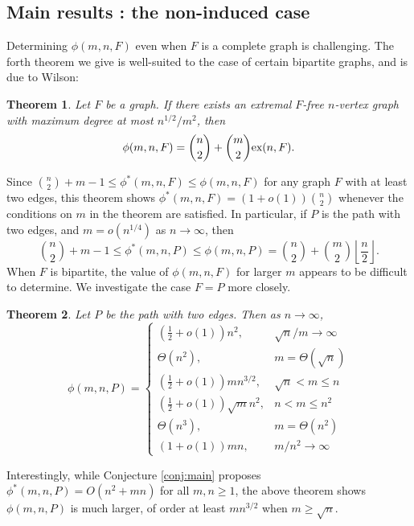 \documentclass[12pt]{article}
\newtheorem{theorem}{Theorem}
\newcommand*{\ex}{\textnormal{ex}}
\begin{document}
\subsection{Main results : the non-induced case}

Determining $\phi(m, n, F)$ even when $F$ is a complete graph is challenging. The forth theorem we give is well-suited to the case of certain bipartite graphs, and is due to Wilson:

\begin{theorem}\label{wilsontheorem}
  Let $F$ be a graph. If there exists an extremal $F$-free $n$-vertex graph with maximum degree at most $n^{1/2}/m^2$, then 
  \[ 
    \phi(m, n, F) = \binom{n}{2} + \binom{m}{2}\ex(n,F).
  \]
\end{theorem}

Since $\binom{n}{2} + m - 1 \leq \phi^*(m, n, F) \leq \phi(m, n, F)$ for any graph $F$ with at least two edges, this theorem shows $\phi^*(m, n, F) = (1 + o(1))\binom{n}{2}$ whenever the conditions on $m$ in the theorem are satisfied. In particular, if $P$ is the path with two edges, and $m = o(n^{1/4})$ as $n \rightarrow \infty$, then 
\[ 
  \binom{n}{2} + m - 1 \leq \phi^*(m, n, P) \leq \phi(m, n, P) = \binom{n}{2} + \binom{m}{2} \left\lfloor \frac{n}{2}\right\rfloor. 
\]
When $F$ is bipartite, the value of $\phi(m, n, F)$ for larger $m$ appears to be difficult to determine. We investigate the case $F = P$ more closely. 

\begin{theorem}\label{thm:pm}
Let $P$ be the path with two edges. Then as $n \rightarrow \infty$,
\[
  \phi(m, n, P) = \begin{cases}
    \left(\frac{1}{2} + o(1)\right)n^2, & \sqrt{n}/m \to \infty \\
    \Theta(n^2), & m = \Theta(\sqrt{n}) \\
    \left(\frac{1}{2} + o(1)\right)mn^{3/2}, & \sqrt{n} < m \leq n \\
    \left(\frac{1}{2} + o(1)\right)\sqrt{m}n^{2}, & n < m \leq n^2 \\
    \Theta(n^3), & m = \Theta(n^2) \\
    \left(1 + o(1)\right)mn, & m/n^2 \to \infty
  \end{cases}
\]
\end{theorem}

Interestingly, while Conjecture \ref{conj:main} proposes $\phi^*(m, n, P) = O(n^2 + mn)$ for all $m,n \geq 1$, the above theorem shows $\phi(m, n, P)$ is much larger, of order at least $mn^{3/2}$ when $m \geq \sqrt{n}$.  
\end{document}
